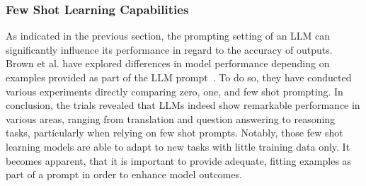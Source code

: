 \subsubsection{Few Shot Learning Capabilities}
As indicated in the previous section, the prompting setting of an LLM can significantly influence its
performance in regard to the accuracy of outputs.
Brown et al\(.\) have explored differences
in model performance depending on examples provided as part of the LLM prompt~\cite{brown_language_2020}.
To do so, they have conducted various experiments directly comparing zero, one, and few shot
prompting.
In conclusion, the trials revealed that LLMs indeed show remarkable performance in various areas,
ranging from translation and question answering to reasoning tasks, particularly when relying on
few shot prompts.
Notably, those few shot learning models are able to adapt to new tasks with little training data
only.
It becomes apparent, that it is important to provide adequate, fitting examples as part of a
prompt in order to enhance model outcomes.

